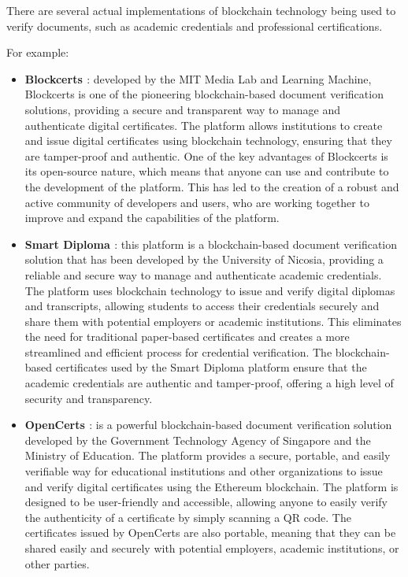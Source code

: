 \documentclass[target=mst,aauheader=]{thud}
\begin{document}
There are several actual implementations of blockchain technology being used to verify documents, such as academic credentials and professional certifications.\par 
For example:

    \begin{itemize}

        \item \textbf{Blockcerts \cite{blockCerts}}: developed by the MIT Media Lab and Learning Machine, Blockcerts is one of the pioneering blockchain-based document verification solutions, providing a secure and transparent way to manage and authenticate digital certificates. The platform allows institutions to create and issue digital certificates using blockchain technology, ensuring that they are tamper-proof and authentic. One of the key advantages of Blockcerts is its open-source nature, which means that anyone can use and contribute to the development of the platform. This has led to the creation of a robust and active community of developers and users, who are working together to improve and expand the capabilities of the platform.
        \item \textbf{Smart Diploma \cite{smartDiploma}}: this platform is a blockchain-based document verification solution that has been developed by the University of Nicosia, providing a reliable and secure way to manage and authenticate academic credentials. The platform uses blockchain technology to issue and verify digital diplomas and transcripts, allowing students to access their credentials securely and share them with potential employers or academic institutions. This eliminates the need for traditional paper-based certificates and creates a more streamlined and efficient process for credential verification. The blockchain-based certificates used by the Smart Diploma platform ensure that the academic credentials are authentic and tamper-proof, offering a high level of security and transparency. 
        \item \textbf{OpenCerts \cite{opencerts}}: is a powerful blockchain-based document verification solution developed by the Government Technology Agency of Singapore and the Ministry of Education. The platform provides a secure, portable, and easily verifiable way for educational institutions and other organizations to issue and verify digital certificates using the Ethereum blockchain. The platform is designed to be user-friendly and accessible, allowing anyone to easily verify the authenticity of a certificate by simply scanning a QR code. The certificates issued by OpenCerts are also portable, meaning that they can be shared easily and securely with potential employers, academic institutions, or other parties.

\end{itemize}
\end{document}
